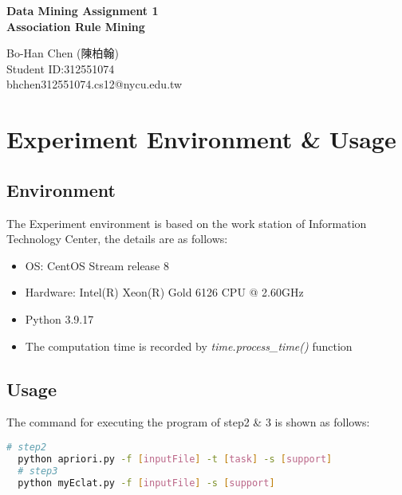 \documentclass[a4paper, oneside, final, 12pt]{scrartcl} %
\begin{document}


\begin{center}
    {\fontsize{18}{30}\textbf{Data Mining Assignment 1 \\ Association Rule Mining}}
\end{center}

\begin{center}
  Bo-Han Chen (陳柏翰) \\
  Student ID:312551074 \\
  bhchen312551074.cs12@nycu.edu.tw
\end{center}

\section{Experiment Environment \& Usage}

\begingroup
\raggedright

\subsection{Environment}

The Experiment environment is based on the work station of Information Technology Center,
the details are as follows:
\begin{itemize}
  \item OS: CentOS Stream release 8
  \item Hardware: Intel(R) Xeon(R) Gold 6126 CPU @ 2.60GHz
  \item Python 3.9.17
  \item The computation time is recorded by \emph{time.process\_time()} function
\end{itemize}

\subsection{Usage}

The command for executing the program of step2 \& 3 is shown as follows:

\begin{lstlisting}[language=bash]
  # step2
  python apriori.py -f [inputFile] -t [task] -s [support]
  # step3
  python myEclat.py -f [inputFile] -s [support]
\end{lstlisting}
\end{document}
